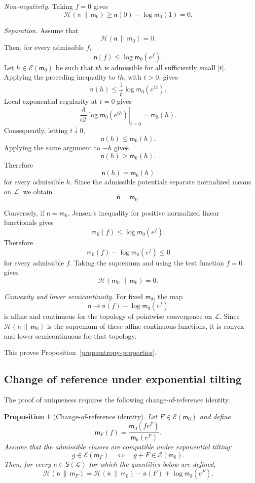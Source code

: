 \documentclass[11pt,reqno]{amsart}
\newtheorem{Proposition}[Theorem]{Proposition}
\begin{document}
\medskip
\noindent
\textit{Non-negativity.}
Taking $f=0$ gives
\[
\mathcal H(\mathsf n\,\|\,\mathsf m_0)
\geq
\mathsf n(0)-\log\mathsf m_0(1)
=
0.
\]

\medskip
\noindent
\textit{Separation.}
Assume that
\[
\mathcal H(\mathsf n\,\|\,\mathsf m_0)=0.
\]
Then, for every admissible $f$,
\[
\mathsf n(f)\leq\log\mathsf m_0(e^f).
\]
Let $h\in\mathcal E(\mathsf m_0)$ be such that $th$ is admissible for
all sufficiently small $|t|$. Applying the preceding inequality to
$th$, with $t>0$, gives
\[
\mathsf n(h)
\leq
\frac{1}{t}\log\mathsf m_0(e^{th}).
\]
Local exponential regularity at $t=0$ gives
\[
\left.
\frac{\mathrm d}{\mathrm dt}
\log\mathsf m_0(e^{th})
\right|_{t=0}
=
\mathsf m_0(h).
\]
Consequently, letting $t\downarrow0$,
\[
\mathsf n(h)\leq\mathsf m_0(h).
\]
Applying the same argument to $-h$ gives
\[
\mathsf n(h)\geq\mathsf m_0(h).
\]
Therefore
\[
\mathsf n(h)=\mathsf m_0(h)
\]
for every admissible $h$. Since the admissible potentials separate
normalized means on $\mathcal L$, we obtain
\[
\mathsf n=\mathsf m_0.
\]

Conversely, if $\mathsf n=\mathsf m_0$, Jensen's inequality for positive
normalized linear functionals gives
\[
\mathsf m_0(f)
\leq
\log\mathsf m_0(e^f).
\]
Therefore
\[
\mathsf m_0(f)-\log\mathsf m_0(e^f)\leq 0
\]
for every admissible $f$. Taking the supremum and using the test
function $f=0$ gives
\[
\mathcal H(\mathsf m_0\,\|\,\mathsf m_0)=0.
\]

\medskip
\noindent
\textit{Convexity and lower semicontinuity.}
For fixed $\mathsf m_0$, the map
\[
\mathsf n
\longmapsto
\mathsf n(f)-\log\mathsf m_0(e^f)
\]
is affine and continuous for the topology of pointwise convergence on
$\mathcal L$. Since $\mathcal H(\mathsf n\,\|\,\mathsf m_0)$ is the
supremum of these affine continuous functions, it is convex and lower
semicontinuous for that topology.

This proves Proposition~\ref{prop:entropy-properties}.

\subsection{Change of reference under exponential tilting}
\label{subsec:change-reference-proof}

The proof of uniqueness requires the following change-of-reference
identity.

\begin{Proposition}[Change-of-reference identity]
\label{prop:change-reference}
Let $F\in\mathcal E(\mathsf m_0)$ and define
\[
\mathsf m_F(f)
=
\frac{\mathsf m_0(fe^F)}{\mathsf m_0(e^F)}.
\]
Assume that the admissible classes are compatible under exponential
tilting:
\[
g\in\mathcal E(\mathsf m_F)
\quad\Longleftrightarrow\quad
g+F\in\mathcal E(\mathsf m_0).
\]
Then, for every $\mathsf n\in\mathsf S(\mathcal L)$ for which the
quantities below are defined,
\[
\mathcal H(\mathsf n\,\|\,\mathsf m_F)
=
\mathcal H(\mathsf n\,\|\,\mathsf m_0)
-
\mathsf n(F)
+
\log\mathsf m_0(e^F).
\]
\end{Proposition}
\end{document}
